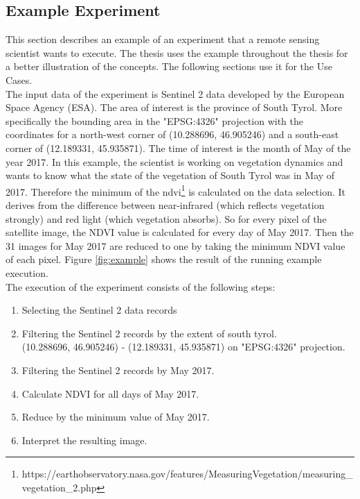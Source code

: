 \documentclass[draft,final]{vutinfth} %
\begin{document}
\subsection{Example Experiment}\label{example}

This section describes an example of an experiment that a remote sensing scientist wants to execute. The thesis uses the example throughout the thesis for a better illustration of the concepts. The following sections use it for the Use Cases. \\
The input data of the experiment is Sentinel 2 data developed by the European Space Agency (ESA). The area of interest is the province of South Tyrol. More specifically the bounding area in the "EPSG:4326" projection with the coordinates for a north-west corner of (10.288696, 46.905246) and a south-east corner of (12.189331, 45.935871). The time of interest is the month of May of the year 2017. In this example, the scientist is working on vegetation dynamics and wants to know what the state of the vegetation of South Tyrol was in May of 2017. Therefore the minimum of the  \gls{ndvi}\footnote{https://earthobservatory.nasa.gov/features/MeasuringVegetation/measuring\_vegetation\_2.php} is calculated on the data selection. It derives from the difference between near-infrared (which reflects vegetation strongly) and red light (which vegetation absorbs). So for every pixel of the satellite image, the NDVI value is calculated for every day of May 2017. Then the 31 images for May 2017 are reduced to one by taking the minimum NDVI value of each pixel. Figure \ref{fig:example} shows the result of the running example execution.\\

The execution of the experiment consists of the following steps:

\begin{enumerate}
	\item Selecting the Sentinel 2 data records
	\item Filtering the Sentinel 2 records by the extent of south tyrol. \\(10.288696, 46.905246) - (12.189331, 45.935871) on "EPSG:4326" projection.
	\item Filtering the Sentinel 2 records by May 2017.
	\item Calculate NDVI for all days of May 2017.
	\item Reduce by the minimum value of May 2017.
	\item Interpret the resulting image.
\end{enumerate}
\end{document}
